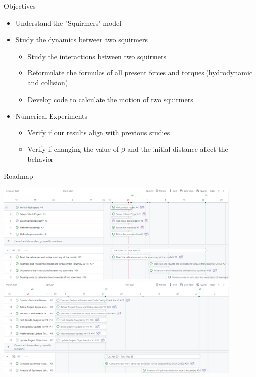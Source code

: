 \documentclass{beamer}
\begin{document}
\begin{frame}{Objectives}
    \begin{itemize}
        \item Understand the "Squirmers" model
        \item Study the dynamics between two squirmers
        \begin{itemize}
            \item Study the interactions between two squirmers
            \item Reformulate the formulas of all present forces and torques (hydrodynamic and collision)
            \item Develop code to calculate the motion of two squirmers
        \end{itemize}
        \item Numerical Experiments
        \begin{itemize}
            \item Verify if our results align with previous studies\cite{Brumley}\cite{Lauga}\cite{Stark}
            \item Verify if changing the value of $\beta$ and the initial distance affect the behavior
        \end{itemize}
    \end{itemize}
\end{frame}

\begin{frame}{Roadmap}
    \begin{center}
        \includegraphics[width=0.9\textwidth]{images/roadmapV0_1.png}
        \vspace{1em} %
        \includegraphics[width=0.9\textwidth]{images/roadmapV0_2.png}
    \end{center}
\end{frame}
\end{document}
